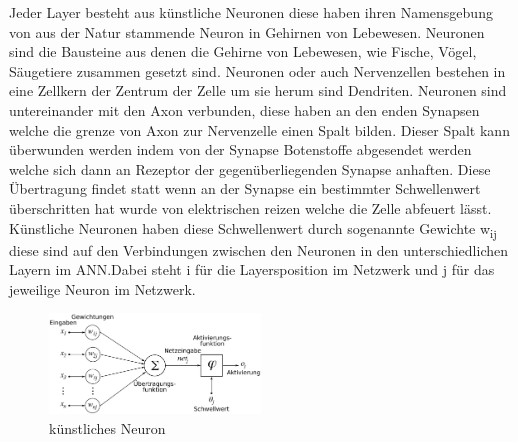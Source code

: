 \documentclass{llncs}
\begin{document}
Jeder Layer besteht aus künstliche Neuronen diese haben ihren Namensgebung von aus der Natur stammende Neuron in Gehirnen von Lebewesen. Neuronen sind die Bausteine aus denen die Gehirne von Lebewesen, wie Fische, Vögel, Säugetiere zusammen gesetzt sind. Neuronen oder auch Nervenzellen bestehen in eine Zellkern der Zentrum der Zelle um sie herum sind Dendriten. Neuronen sind untereinander mit den Axon verbunden, diese haben an den enden Synapsen welche die grenze von Axon zur Nervenzelle einen Spalt bilden. Dieser Spalt kann überwunden werden indem von der Synapse Botenstoffe abgesendet werden welche sich dann an Rezeptor der gegenüberliegenden Synapse anhaften. Diese Übertragung findet statt wenn an der Synapse ein bestimmter Schwellenwert überschritten hat wurde von elektrischen reizen welche die Zelle abfeuert lässt. Künstliche Neuronen haben diese Schwellenwert durch sogenannte Gewichte w\textsubscript{ij} diese sind auf den Verbindungen zwischen den Neuronen in den unterschiedlichen Layern im ANN.Dabei steht i für die Layersposition im Netzwerk und j für das jeweilige Neuron im Netzwerk. 

\begin{figure}[htbp] 
	\centering
	\includegraphics[width=0.5\textwidth]{Neuron.png}
	\caption{künstliches Neuron}
	\label{fig:Bild2}
\end{figure}
\end{document}
